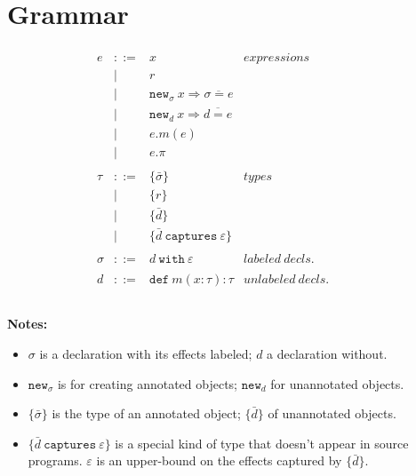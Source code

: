 \documentclass{llncs}
\newcommand{\keywadj}[1]{\mathtt{#1}}
\newcommand{\keyw}[1]{\keywadj{#1}~}
\begin{document}
\section{Grammar}

\[
\begin{array}{lll}

\begin{array}{lllr}

e & ::= & x & expressions \\
  		& | & r \\
		& | & \keywadj{new}_\sigma~x \Rightarrow \overline{\sigma = e} \\
 		& | & \keywadj{new}_d~x \Rightarrow \overline{d = e} \\
 		& | & e.m(e)\\
 		& | & e.\pi\\
		&&\\

\tau & ::= & \{ \bar \sigma \} & types \\
		& | & \{ r \} \\
		& | & \{ \bar d \} \\
		& | & \{ \bar d ~\keyw{captures} \varepsilon \} \\
		&&\\
		
\sigma & ::= & d~\keyw{with}\varepsilon  & labeled~ decls.\\
		&&\\

d & ::= & \keyw{def} m(x:\tau):\tau & unlabeled~decls.\\
		&&\\

\end{array}
& ~~~~~~
&
\end{array}
\]

\noindent \textbf{Notes:}
\begin{itemize}
	\item $\sigma$ is a declaration with its effects labeled; $d$ a declaration without.
	\item $\keywadj{new}_\sigma$ is for creating annotated objects; $\keywadj{new}_d$ for unannotated objects.
	\item $\{ \bar \sigma \}$ is the type of an annotated object; $\{ \bar d \}$ of unannotated objects.
	\item $\{ \bar d ~\keyw{captures} \varepsilon \}$ is a special kind of type that doesn't appear in source programs. $\varepsilon$ is an upper-bound on the effects captured by $\{ \bar d \}$.
\end{itemize}
\end{document}
